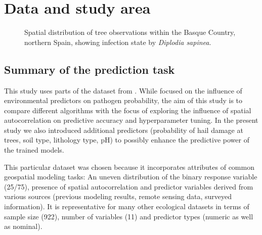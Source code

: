 \documentclass[review]{elsarticle}
\begin{document}
\section{Data and study area}

\begin{figure} [t!]
	\begin{center}
		\caption[Study area]{Spatial distribution of tree observations within the Basque Country, northern Spain, showing infection state by \textit{Diplodia sapinea}.}
		\label{fig: study_area}
	\end{center}
\end{figure}

\subsection{Summary of the prediction task}
This study uses parts of the dataset from \cite{Iturritxa2014}.
While \cite{Iturritxa2014} focused on the influence of environmental predictors on pathogen probability, the aim of this study is to compare different algorithms with the focus of exploring the influence of spatial autocorrelation on predictive accuracy and hyperparameter tuning.
In the present study we also introduced additional predictors (probability of hail damage at trees, soil type, lithology type, pH) to possibly enhance the predictive power of the trained models.

This particular dataset was chosen because it incorporates attributes of common geospatial modeling tasks:
An uneven distribution of the binary response variable (25/75), presence of spatial autocorrelation and predictor variables derived from various sources (previous modeling results, remote sensing data, surveyed information).
It is representative for many other ecological datasets in terms of sample size (922), number of variables (11) and predictor types (numeric as well as nominal).
\end{document}
